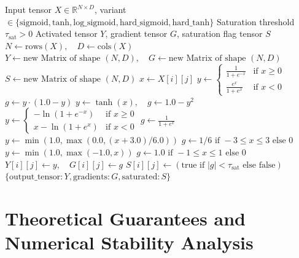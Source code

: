 \documentclass[11pt,a4paper]{article}
\theoremstyle{definition}
\begin{document}
\begin{algorithm}[H]
\caption{Sigmoid / Tanh Forward Evaluation and Saturation Detection}
\begin{algorithmic}[1]
\Require Input tensor $X \in \mathbb{R}^{N \times D}$, variant $\in \{\text{sigmoid}, \text{tanh}, \text{log\_sigmoid}, \text{hard\_sigmoid}, \text{hard\_tanh}\}$
\Require Saturation threshold $\tau_{\text{sat}} > 0$
\Ensure Activated tensor $Y$, gradient tensor $G$, saturation flag tensor $S$
\State $N \gets \text{rows}(X), \quad D \gets \text{cols}(X)$
\State $Y \gets \text{new Matrix of shape } (N, D), \quad G \gets \text{new Matrix of shape } (N, D)$
\State $S \gets \text{new Matrix of shape } (N, D)$
        \State $x \gets X[i][j]$
            \State $y \gets \begin{cases} \frac{1}{1 + e^{-x}} & \text{if } x \ge 0 \\ \frac{e^x}{1 + e^x} & \text{if } x < 0 \end{cases}$
            \State $g \gets y \cdot (1.0 - y)$
            \State $y \gets \tanh(x), \quad g \gets 1.0 - y^2$
            \State $y \gets \begin{cases} -\ln(1 + e^{-x}) & \text{if } x \ge 0 \\ x - \ln(1 + e^x) & \text{if } x < 0 \end{cases}$
            \State $g \gets \frac{1}{1 + e^x}$
            \State $y \gets \min(1.0, \max(0.0, (x + 3.0) / 6.0))$
            \State $g \gets 1/6 \text{ if } -3 \le x \le 3 \text{ else } 0$
            \State $y \gets \min(1.0, \max(-1.0, x))$
            \State $g \gets 1.0 \text{ if } -1 \le x \le 1 \text{ else } 0$
        \EndIf
        \State $Y[i][j] \gets y, \quad G[i][j] \gets g$
        \State $S[i][j] \gets (\text{true if } |g| < \tau_{\text{sat}} \text{ else false})$
    \EndFor
\EndFor
\State \Return $\{\text{output\_tensor}: Y, \text{gradients}: G, \text{saturated}: S\}$
\end{algorithmic}
\end{algorithm}

\section{Theoretical Guarantees and Numerical Stability Analysis}
\end{document}
